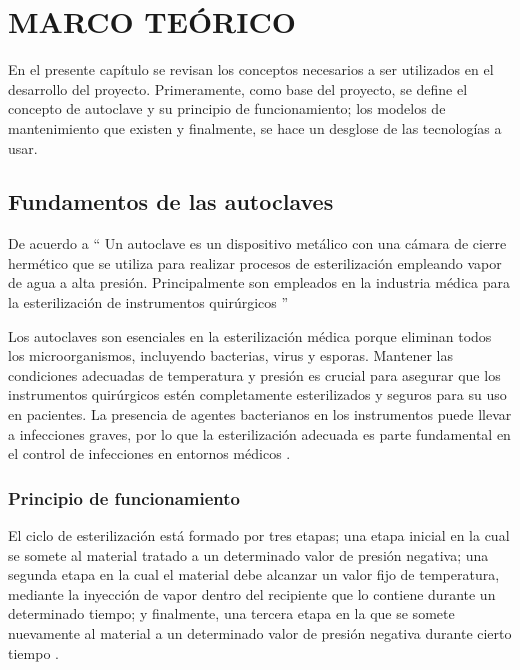 
\newpage

%
%

\section{MARCO TEÓRICO}
 En el presente capítulo se revisan los conceptos necesarios a ser utilizados en el desarrollo del proyecto. Primeramente, como base del proyecto, se define el concepto de autoclave y su principio de funcionamiento; los modelos de mantenimiento que existen y finalmente, se hace un desglose de las tecnologías a usar.
 
\subsection{Fundamentos de las autoclaves}
De acuerdo a \cite{autoclave} `` Un autoclave es un dispositivo metálico con una cámara de cierre hermético que se utiliza para realizar procesos de esterilización empleando vapor de agua a alta presión. Principalmente son empleados en la industria médica para la esterilización de instrumentos quirúrgicos '' 

Los autoclaves son esenciales en la esterilización médica porque eliminan todos los microorganismos, incluyendo bacterias, virus y esporas. Mantener las condiciones adecuadas de temperatura y presión es crucial para asegurar que los instrumentos quirúrgicos estén completamente esterilizados y seguros para su uso en pacientes. La presencia de agentes bacterianos en los instrumentos puede llevar a infecciones graves, por lo que la esterilización adecuada es parte fundamental en el control de infecciones en entornos médicos \citep{autoclave2}.

\subsubsection{Principio de funcionamiento}

El ciclo de esterilización está formado por tres etapas; una etapa inicial en la cual se somete al material tratado a un determinado valor de presión negativa; una segunda etapa en la cual el material debe alcanzar un valor fijo de temperatura, mediante la inyección de vapor dentro del recipiente que lo contiene durante un determinado tiempo; y finalmente, una tercera etapa en la que se somete nuevamente al material a un determinado valor de presión negativa durante cierto tiempo \citep{funcionamiento}.

